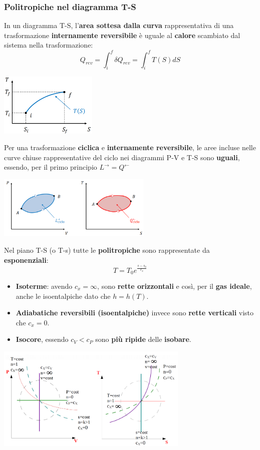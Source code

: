 \subsubsection{Politropiche nel diagramma T-S}
In un diagramma T-S, l'\textbf{area sottesa dalla curva} rappresentativa di una trasformazione \textbf{internamente reversibile} è uguale al \textbf{calore} scambiato dal sistema nella trasformazione:
\[
    Q_{rev} = \int_{i}^{f}\delta Q_{rev} = \int_{i}^{f} T(S)dS
\]
\begin{center}
    \includegraphics[height=3cm]{../L03/img8.PNG}
\end{center}
Per una trasformazione \textbf{ciclica} e \textbf{internamente reversibile}, le aree incluse nelle curve chiuse rappresentative del ciclo nei diagrammi P-V e T-S sono \textbf{uguali}, essendo, per il primo principio $L^\rightarrow  = Q^\leftarrow $
\begin{center}
    \includegraphics[height=3cm]{../L03/img9.PNG}
\end{center}
Nel piano T-S (o T-s) tutte le \textbf{politropiche} sono rappresentate da \textbf{esponenziali}:
\[
    T = T_0 e^{\frac{s-s_0}{c_x}}
\]
\begin{itemize}
    \item \textbf{Isoterme}: avendo $c_x = \infty$, sono \textbf{rette orizzontali} e così, per il \textbf{gas ideale}, anche le isoentalpiche dato che $h = h(T)$.
    \item \textbf{Adiabatiche reversibili (isoentalpiche)} invece sono \textbf{rette verticali} visto che $c_x = 0$.
    \item \textbf{Isocore}, essendo $c_V< c_P$ sono \textbf{più ripide} delle \textbf{isobare}.
\end{itemize}
\begin{center}
    \includegraphics[height=5cm]{../L03/img10.PNG}
\end{center}
